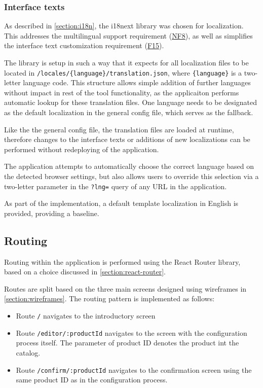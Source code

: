 \subsubsection{Interface texts}

As described in \autoref{section:i18n}, the i18next library was chosen for localization. This addresses the multilingual support requirement (\hyperref[itm:NF8]{NF8}), as well as simplifies the interface text customization requirement (\hyperref[itm:F15]{F15}).

The library is setup in such a way that it expects for all localization files to be located in \texttt{/locales/\{language\}/translation.json}, where \texttt{\{language\}} is a two-letter language code. This structure allows simple addition of further languages without impact in rest of the tool functionality, as the applicaiton performs automatic lookup for these translation files. One language needs to be designated as the default localization in the general config file, which serves as the fallback.

Like the the general config file, the translation files are loaded at runtime, therefore changes to the interface texts or additions of new localizations can be performed without redeploying of the application.

The application attempts to automatically choose the correct language based on the detected browser settings, but also allows users to override this selection via a two-letter parameter in the \texttt{?lng=} query of any URL in the application.  

As part of the implementation, a default template localization in English is provided, providing a baseline.

\subsection{Routing}

Routing within the application is performed using the React Router library, based on a choice discussed in \autoref{section:react-router}.

Routes are split based on the three main screens designed using wireframes in \autoref{section:wireframes}. The routing pattern is implemented as follows:

\begin{itemize}[label=\rectanglebullet]
    \item Route \texttt{/} navigates to the introductory screen
    \item Route \texttt{/editor/:productId} navigates to the screen with the configuration process itself. The parameter of product ID denotes the product int the catalog.
    \item Route \texttt{/confirm/:productId} navigates to the confirmation screen using the same product ID as in the configuration process.
\end{itemize}

